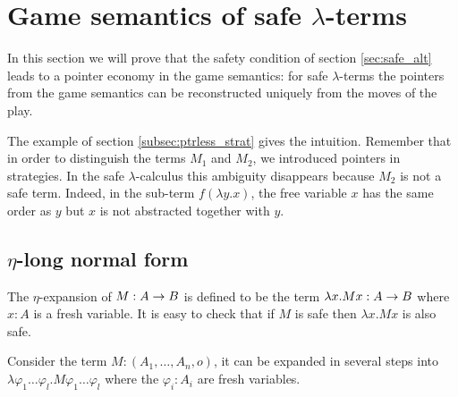 \def\cmptre#1{\tau(#1)}
\def\aux#1{\lceil #1\rceil}
\def\nf#1{\eta_{\sf nf}(#1)}

\section{Game semantics of safe $\lambda$-terms}

In this section we will prove that the safety condition
of section \ref{sec:safe_alt} leads to a pointer economy in the game
semantics: for safe $\lambda$-terms the pointers from the game semantics can be reconstructed uniquely from the moves of
the play.

The example of section \ref{subsec:ptrless_strat} gives the intuition.
Remember that in order to distinguish the terms $M_1$ and $M_2$,
we introduced pointers in strategies. In the safe $\lambda$-calculus
this ambiguity disappears because $M_2$ is not a safe term. Indeed, in the
sub-term $f (\lambda y . x)$, the free variable $x$
has the same order as $y$ but $x$ is not abstracted together
with $y$.


%
%






\subsection{$\eta$-long normal form}

The $\eta$-expansion of $M: A\rightarrow B$ is defined to be the term $\lambda x . M x : A\rightarrow B$ where $x:A$ is a fresh variable.
It is easy to check that if $M$ is safe then $\lambda x . M x$ is also safe.

Consider the term $M : (A_1,\ldots,A_n,o)$, it can be expanded in several steps into
$\lambda \varphi_1 \ldots \varphi_l . M \varphi_1 \ldots \varphi_l$
where the $\varphi_i:A_i$ are fresh variables.

